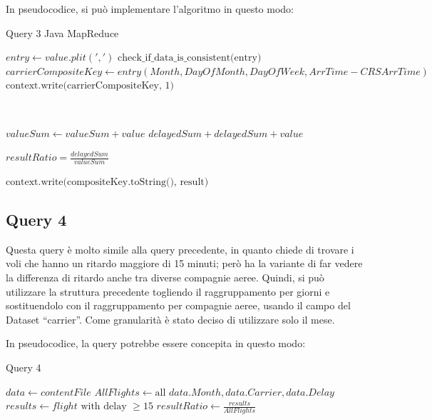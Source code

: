 \documentclass[11pt]{article} %
\begin{document}
In pseudocodice, si può implementare l'algoritmo in questo modo:

\newpage 

\begin{algorithm}
\caption{Query 3 Java MapReduce}\label{euclid}
\begin{algorithmic}[0]


\State $entry \gets value.plit(',')$
\State $\text{check\_if\_data\_is\_consistent(entry)}$
\State $carrierCompositeKey \gets entry(Month, DayOfMonth, DayOfWeek, ArrTime - CRSArrTime)$
\State $\text{context.write(carrierCompositeKey, 1)}$

\EndProcedure

~


	\State $valueSum \gets valueSum + value$
		\State $delayedSum + delayedSum + value$
	\EndIf
\EndFor

\State $resultRatio = \frac{delayedSum}{valueSum}$

\State $\text{context.write(compositeKey.toString(), result)}$

\EndProcedure


\end{algorithmic}
\end{algorithm}

\subsection{Query 4}

Questa query è molto simile alla query precedente, in quanto chiede di trovare i voli che hanno un ritardo maggiore di 15 minuti; però ha la variante di far vedere la differenza di ritardo anche tra diverse compagnie aeree. Quindi, si può utilizzare la struttura precedente togliendo il raggruppamento per giorni e sostituendolo con il raggruppamento per compagnie aeree, usando il campo del Dataset ``carrier''.  Come granularità è stato deciso di utilizzare solo il mese.

In pseudocodice, la query potrebbe essere concepita in questo modo:

\begin{algorithm}
\caption{Query 4}\label{euclid}
\begin{algorithmic}[0]
\State $data \gets contentFile$
\State $AllFlights \gets \text{all } data.Month, data.Carrier, data.Delay$
\State $results \gets flight \text{ with delay } \geqslant 15$
\State $resultRatio \gets \frac{results}{AllFlights}$
\EndFor
\end{algorithmic}
\end{algorithm}
\end{document}
